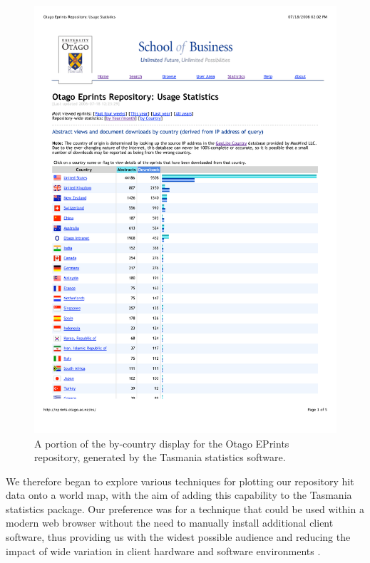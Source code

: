 \documentclass[acmtocl,acmnow]{acmtrans2m}
\begin{document}
\begin{figure}
	\begin{center}
		\includegraphics[scale=0.65]{tasmania_stats}
	\end{center}
	\caption{A portion of the by-country display for the Otago EPrints
	repository, generated by the Tasmania statistics software.}
	\label{fig-tas-stats}
\end{figure}


We therefore began to explore various techniques for plotting our
repository hit data onto a world map, with the aim of adding this
capability to the Tasmania statistics package. Our preference was for a
technique that could be used within a modern web browser without the
need to manually install additional client software, thus providing us
with the widest possible audience and reducing the impact of wide
variation in client hardware and software environments \cite[pp.\
27--28]{Offu-J-2002-quality}.
\end{document}
